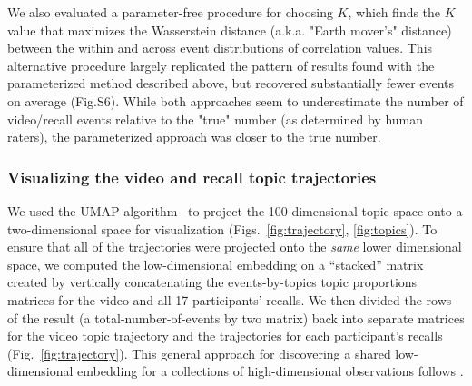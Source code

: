\documentclass{article}
\newcommand{\wasserstein}{S6}
\begin{document}
We also evaluated a parameter-free procedure for choosing $K$, which finds the $K$ value that maximizes the Wasserstein distance (a.k.a. "Earth mover's" distance) between the within and across event distributions of correlation values. This alternative procedure largely replicated the pattern of results found with the parameterized method described above, but recovered substantially fewer events on average (Fig.\wasserstein). While both approaches seem to underestimate the number of video/recall events relative to the "true" number (as determined by human raters), the parameterized approach was closer to the true number.


\subsubsection*{Visualizing the video and recall topic trajectories}
We used the UMAP algorithm~\citep{McInHeal18} to project the 100-dimensional topic space onto a two-dimensional space for visualization (Figs.~\ref{fig:trajectory}, \ref{fig:topics}).  To ensure that all of the trajectories were projected onto the \textit{same} lower dimensional space, we computed the low-dimensional embedding on a ``stacked'' matrix created by vertically concatenating the events-by-topics topic proportions matrices for the video and all 17 participants' recalls.  We then divided the rows of the result (a total-number-of-events by two matrix) back into separate matrices for the video topic trajectory and the trajectories for each participant's recalls (Fig.~\ref{fig:trajectory}).  This general approach for discovering a shared low-dimensional embedding for a collections of high-dimensional observations follows \cite{HeusEtal18a}.
\end{document}

